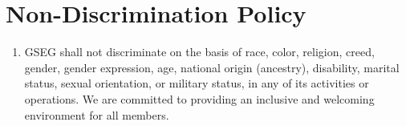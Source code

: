 \chapter{\nohyphens{Non-Discrimination Policy}}

\begin{enumerate}[label=\Alph*.]
\item GSEG shall not discriminate on the basis of race, color, religion, creed, gender, gender expression, age, national origin (ancestry), disability, marital status, sexual orientation, or military status, in any of its activities or operations. We are committed to providing an inclusive and welcoming environment for all members.
\end{enumerate}

